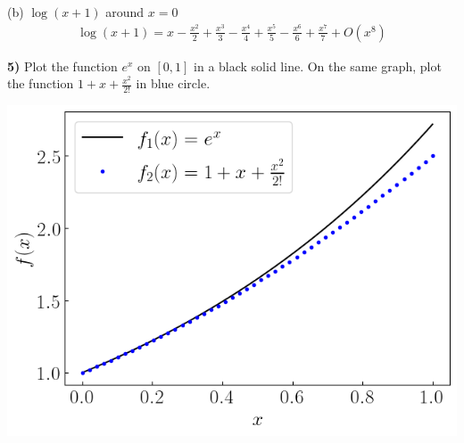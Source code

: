 \documentclass[12pt,a4paper]{article}
\newcommand{\prob}[2]{\textbf{#1)} #2}
\begin{document}
(b) $\log(x+1)$ around $x = 0$
\begin{align*}
\log(x+1) = x - \frac{x^{2}}{2} + \frac{x^{3}}{3} - \frac{x^{4}}{4} + \frac{x^{5}}{5} - \frac{x^{6}}{6} + \frac{x^{7}}{7} + O\left(x^{8}\right)
\end{align*}


\prob{5}{Plot the function $e^x$ on $[0,1]$ in a black solid line. On the same graph, plot the function $1+x+\frac{x^2}{2!}$ in blue circle.}

\bef
\includegraphics[scale=0.75]{prob5fig.png}
\eef

\end{document}
